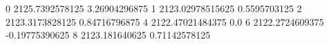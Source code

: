 0 2125.7392578125 3.26904296875
1 2123.02978515625 0.5595703125
2 2123.3173828125 0.84716796875
4 2122.47021484375 0.0
6 2122.2724609375 -0.19775390625
8 2123.181640625 0.71142578125
